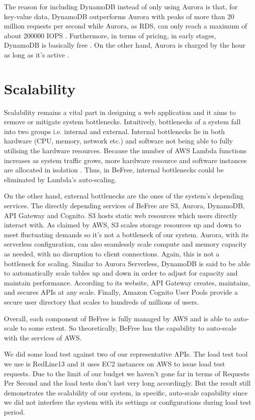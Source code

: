 \documentclass[conference]{IEEEtran}
\begin{document}
The reason for including DynamoDB instead of only using Aurora is that, for key-value data, DynamoDB outperforms Aurora with peaks of more than 20 million requests per second \cite{dynamodb} while Aurora, as RDS, can only reach a maximum of about 200000 IOPS \cite{rds-mysql} \cite{aurora-feature}. Furthermore, in terms of pricing, in early stages, DynamoDB is basically free \cite{dynamodb-pricing}. On the other hand, Aurora is charged by the hour as long as it's active \cite{aurora-pricing}.

\section{Scalability}
Scalability remains a vital part in designing a web application and it aims to remove or mitigate system bottlenecks. Intuitively, bottlenecks of a system fall into two groups i.e. internal and external. Internal bottlenecks lie in both hardware (CPU, memory, network etc.) and software not being able to fully utilising the hardware resources. Because the number of AWS Lambda functions increases as system traffic grows, more hardware resource and software instances are allocated in isolation \cite{dynamodb-pricing}. Thus, in BeFree, internal bottlenecks could be eliminated by Lambda's auto-scaling.

On the other hand, external bottlenecks are the ones of the system's depending services. The directly depending services of BeFree are S3, Aurora, DynamoDB, API Gateway and Cognito. S3 hosts static web resources which users directly interact with. As claimed by AWS, S3 scales storage resources up and down to meet fluctuating demands so it's not a bottleneck of our system. Aurora, with its serverless configuration, can also seamlessly scale compute and memory capacity as needed, with no disruption to client connections. Again, this is not a bottleneck for scaling. Similar to Aurora Serverless, DynamoDB is said to be able to automatically scale tables up and down in order to adjust for capacity and maintain performance. According to its website, API Gateway creates, maintains, and secures APIs at any scale. Finally, Amazon Cognito User Pools provide a secure user directory that scales to hundreds of millions of users.

Overall, each component of BeFree is fully managed by AWS and is able to auto-scale to some extent. So theoretically, BeFree has the capability to auto-scale with the services of AWS.

We did some load test against two of our representative APIs. The load test tool we use is RedLine13 \cite{redline13} and it uses EC2 instances on AWS to issue load test requests. Due to the limit of our budget we haven't gone far in terms of Requests Per Second and the load tests don't last very long accordingly. But the result still demonstrates the scalability of our system, in specific, auto-scale capability since we did not interfere the system with its settings or configurations during load test period.
\end{document}
